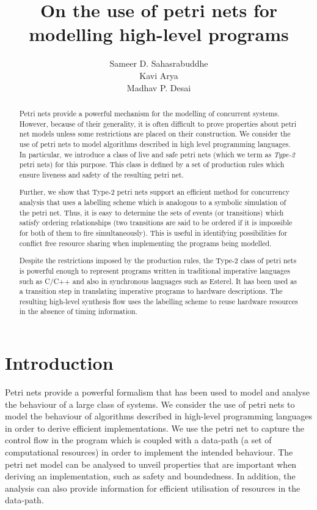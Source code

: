 \documentclass[12pt,a4paper]{article}
\title{On the use of petri nets for modelling high-level programs}
\author{Sameer D. Sahasrabuddhe \\ Kavi Arya \\ Madhav P. Desai}
\date{}
\begin{document}
\maketitle

\begin{abstract}

  Petri nets provide a powerful mechanism for the modelling of
  concurrent systems. However, because of their generality, it is
  often difficult to prove properties about petri net models unless
  some restrictions are placed on their construction. We consider the
  use of petri nets to model algorithms described in high level
  programming languages. In particular, we introduce a class of live
  and safe petri nets (which we term as {\em Type-2} petri nets) for
  this purpose. This class is defined by a set of production rules
  which ensure liveness and safety of the resulting petri net.
  
  Further, we show that Type-2 petri nets support an efficient method
  for concurrency analysis that uses a labelling scheme which is
  analogous to a symbolic simulation of the petri net. Thus, it is
  easy to determine the sets of events (or transitions) which satisfy
  ordering relationships (two transitions are said to be ordered if it
  is impossible for both of them to fire simultaneously). This is
  useful in identifying possibilities for conflict free resource
  sharing when implementing the programs being modelled.

  Despite the restrictions imposed by the production rules, the Type-2
  class of petri nets is powerful enough to represent programs written
  in traditional imperative languages such as C/C++ and also in
  synchronous languages such as Esterel. It has been used as a
  transition step in translating imperative programs to hardware
  descriptions\cite{ahir-thesis}. The resulting high-level synthesis
  flow uses the labelling scheme to reuse hardware resources in the
  absence of timing information.

\end{abstract}

\section{Introduction}
\label{sec:introduction}

Petri nets provide a powerful formalism that has been used to model
and analyse the behaviour of a large class of systems. We consider the
use of petri nets to model the behaviour of algorithms described in
high-level programming languages in order to derive efficient
implementations. We use the petri net to capture the control flow in
the program which is coupled with a data-path (a set of computational
resources) in order to implement the intended behaviour. The petri net
model can be analysed to unveil properties that are important when
deriving an implementation, such as safety and boundedness. In
addition, the analysis can also provide information for efficient
utilisation of resources in the data-path.
\end{document}
